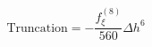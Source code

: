 \begin{equation} 
\text{Truncation} = - \frac{f^{{(8)}}_{{\xi}}}{560} {\Delta h}^{6}
 \end{equation}